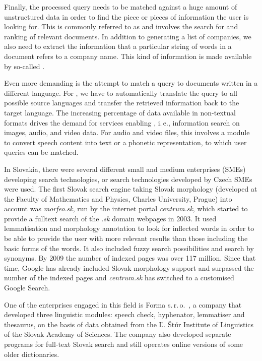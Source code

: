 \begin{multicols}{2}
Finally, the processed query needs to be matched against a huge amount of unstructured data in order to find the piece or pieces of information the user is looking for. This is commonly referred to as  and involves the search for and ranking of relevant documents. In addition to generating a list of companies, we also need to extract the information that a particular string of words in a document refers to a company name. This kind of information is made available by so-called . 

Even more demanding is the attempt to match a query to documents written in a different language. For , we have to automatically translate the query to all possible source languages and transfer the retrieved information back to the target language. The increasing percentage of data available in non-textual formats drives the demand for services enabling , i.\,e., information search on images, audio, and video data. For audio and video files, this involves a  module to convert speech content into text or a phonetic representation, to which user queries can be matched.

In Slovakia, there were several different small and medium enterprises (SMEs) developing search technologies, or search technologies developed by Czech SMEs were used. The first Slovak search engine taking Slovak morphology (developed at the Faculty of Mathematics and Physics, Charles University, Prague) into account was \emph{morfeo.sk}, run by the internet portal \emph{centrum.sk}, which started to provide a fulltext search of the \emph{.sk} domain webpages in 2003. It used lemmatisation and morphology annotation to look for inflected words in order to be able to provide the user with more relevant results than those including the basic forms of the words. It also included fuzzy search possibilities and search by synonyms. By 2009 the number of indexed pages was over 117 million. Since that time, Google has already included Slovak morphology support and surpassed the number of the indexed pages and \emph{centrum.sk} has switched to a customised Google Search.

One of the enterprises engaged in this field is Forma s.\,r.\,o.~\cite{f25}, a company that developed three linguistic modules: speech check, hyphenator, lemmatiser and thesaurus, on the basis of data obtained from the Ľ. Štúr Institute of Linguistics of the Slovak Academy of Sciences. The company also developed separate programs for full-text Slovak search and still operates online versions of some older dictionaries. 


\end{multicols}
